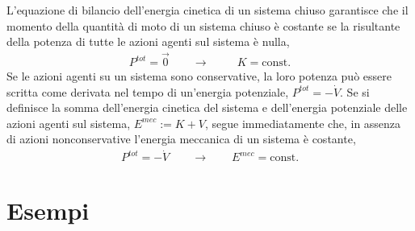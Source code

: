 \documentclass[letterpaper,10pt,italian]{jupyterBook}
\begin{document}
\sphinxAtStartPar
{}
L’equazione di bilancio dell’energia cinetica di un sistema chiuso garantisce che il momento della quantità di moto di un sistema chiuso è costante se la risultante della potenza di tutte le azioni agenti sul sistema è nulla,
\begin{equation*}
\begin{split}
  P^{tot} = \vec{0} \qquad  \rightarrow \qquad \ \  K = \text{const.}
\end{split}
\end{equation*}
\sphinxAtStartPar
{} Se le azioni agenti su un sistema sono conservative, la loro potenza può essere scritta come derivata nel tempo di un’energia potenziale, \(P^{tot} = - \dot{V}\). Se si definisce  la somma dell’energia cinetica del sistema e dell’energia potenziale delle azioni agenti sul sistema, \(E^{mec} := K + V\), segue immediatamente che, in assenza di azioni non\sphinxhyphen{}conservative l’energia meccanica di un sistema è costante,
\begin{equation*}
\begin{split}P^{tot} = - \dot{V} \qquad \rightarrow \qquad E^{mec} = \text{const.}\end{split}
\end{equation*}
\sphinxstepscope


\section{Esempi}
\label{\detokenize{ch/mechanics/dynamics-examples:esempi}}\label{\detokenize{ch/mechanics/dynamics-examples:physics-hs-mechanics-dynamics-examples}}\label{\detokenize{ch/mechanics/dynamics-examples::doc}}
\end{document}
